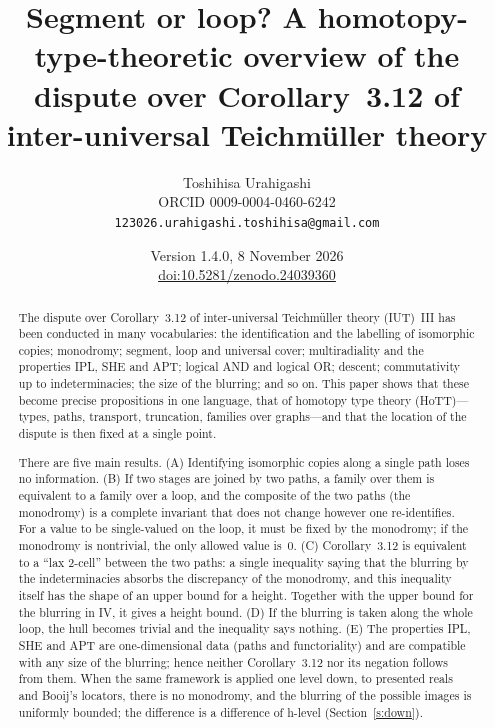 \documentclass[11pt,a4paper]{article}
\title{Segment or loop? A homotopy-type-theoretic overview of the dispute over Corollary~3.12 of
inter-universal Teichm\"uller theory}
\author{Toshihisa Urahigashi\\\small ORCID 0009-0004-0460-6242\\\small\texttt{123026.urahigashi.toshihisa@gmail.com}}
\date{Version 1.4.0, 8 November 2026\\\small\href{https://doi.org/10.5281/zenodo.24039360}{doi:10.5281/zenodo.24039360}}
\theoremstyle{plain}
\theoremstyle{definition}
\theoremstyle{remark}
\begin{document}
\maketitle

\begin{abstract}
The dispute over Corollary~3.12 of inter-universal Teichm\"uller theory (IUT)~III has been conducted in many
vocabularies: the identification and the labelling of isomorphic copies; monodromy; segment, loop and universal cover;
multiradiality and the properties IPL, SHE and APT; logical AND and logical OR; descent; commutativity up to
indeterminacies; the size of the blurring; and so on. This paper shows that these become precise propositions in one
language, that of homotopy type theory (HoTT)---types, paths, transport, truncation, families over graphs---and that
the location of the dispute is then fixed at a single point.

There are five main results. (A) Identifying isomorphic copies along a single path loses no information. (B) If two
stages are joined by two paths, a family over them is equivalent to a family over a loop, and the composite of the two
paths (the monodromy) is a complete invariant that does not change however one re-identifies. For a value to be
single-valued on the loop, it must be fixed by the monodromy; if the monodromy is nontrivial, the only allowed value
is~$0$. (C) Corollary~3.12 is equivalent to a ``lax 2-cell'' between the two paths: a single inequality saying that the
blurring by the indeterminacies absorbs the discrepancy of the monodromy, and this inequality itself has the shape of an
upper bound for a height. Together with the upper bound for the blurring in IV, it gives a height bound. (D) If the
blurring is taken along the whole loop, the hull becomes trivial and the inequality says nothing. (E) The properties
IPL, SHE and APT are one-dimensional data (paths and functoriality) and are compatible with any size of the blurring;
hence neither Corollary~3.12 nor its negation follows from them. When the same framework is applied one level down, to
presented reals and Booij's locators, there is no monodromy, and the blurring of the possible images is uniformly
bounded; the difference is a difference of h-level (Section~\ref{s:down}).


\end{abstract}
\end{document}
